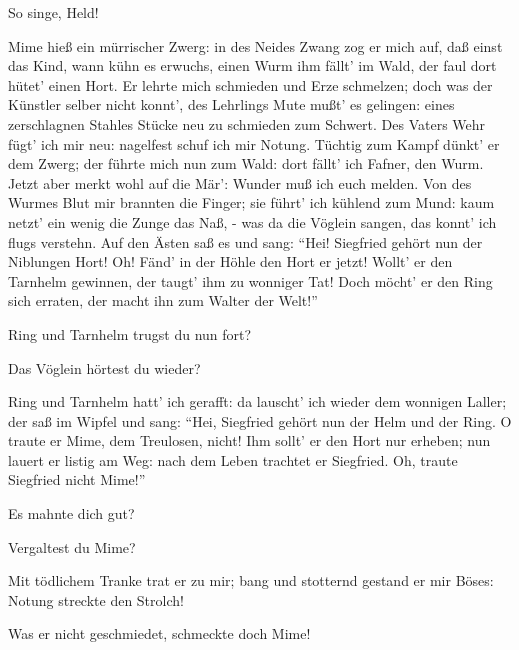 \begin{drama}
\Hagenspeaks

So singe, Held!
 

\Siegfriedspeaks

Mime hieß ein mürrischer Zwerg:
in des Neides Zwang zog er mich auf,
daß einst das Kind, wann kühn es erwuchs,
einen Wurm ihm fällt' im Wald,
der faul dort hütet' einen Hort.
Er lehrte mich schmieden und Erze schmelzen;
doch was der Künstler selber nicht konnt',
des Lehrlings Mute mußt' es gelingen:
eines zerschlagnen Stahles Stücke
neu zu schmieden zum Schwert.
Des Vaters Wehr fügt' ich mir neu:
nagelfest schuf ich mir Notung.
Tüchtig zum Kampf dünkt' er dem Zwerg;
der führte mich nun zum Wald:
dort fällt' ich Fafner, den Wurm.
Jetzt aber merkt wohl auf die Mär':
Wunder muß ich euch melden.
Von des Wurmes Blut
mir brannten die Finger;
sie führt' ich kühlend zum Mund:
kaum netzt' ein wenig
die Zunge das Naß, -
was da die Vöglein sangen,
das konnt' ich flugs verstehn.
Auf den Ästen saß es und sang:
``Hei! Siegfried gehört nun
der Niblungen Hort!
Oh! Fänd' in der Höhle
den Hort er jetzt!
Wollt' er den Tarnhelm gewinnen,
der taugt' ihm zu wonniger Tat!
Doch möcht' er den Ring sich erraten,
der macht ihn zum Walter der Welt!''
 

\Hagenspeaks

Ring und Tarnhelm trugst du nun fort?
 

Das Vöglein hörtest du wieder?
 

\Siegfriedspeaks

Ring und Tarnhelm hatt' ich gerafft:
da lauscht' ich wieder dem wonnigen Laller;
der saß im Wipfel und sang:
``Hei, Siegfried gehört nun der Helm und der Ring.
O traute er Mime, dem Treulosen, nicht!
Ihm sollt' er den Hort nur erheben;
nun lauert er listig am Weg:
nach dem Leben trachtet er Siegfried.
Oh, traute Siegfried nicht Mime!''
 

\Hagenspeaks

Es mahnte dich gut?
 

Vergaltest du Mime?
 

\Siegfriedspeaks

Mit tödlichem Tranke trat er zu mir;
bang und stotternd gestand er mir Böses:
Notung streckte den Strolch!
 

\Hagenspeaks



Was er nicht geschmiedet,
schmeckte doch Mime!
 



\end{drama}
